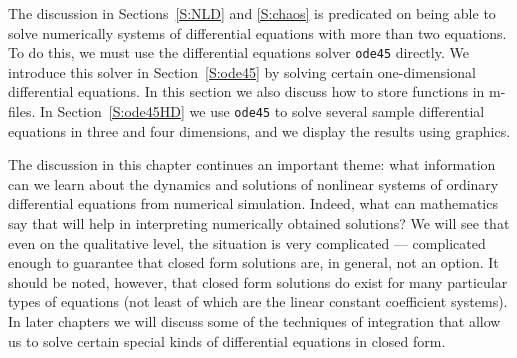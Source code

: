 \documentclass{ximera}
\begin{document}
The discussion in Sections~\ref{S:NLD} and \ref{S:chaos} is predicated on 
being able to solve numerically systems of differential equations with more 
than two equations.  To do this, we must use the \Matlab differential 
equations solver {\tt ode45} directly.  We introduce this solver in 
Section~\ref{S:ode45} by solving certain one-dimensional differential 
equations.  In this section we also discuss how to store functions in \Matlab 
m-files.  In Section~\ref{S:ode45HD} we use {\tt ode45} to solve several 
sample differential equations in three and four dimensions, and we display 
the results using \Matlab graphics. 

The discussion in this chapter continues an important theme: what 
information can we learn about the dynamics and solutions of nonlinear 
systems of ordinary differential equations from numerical simulation.  
Indeed, what can mathematics say that will help in interpreting numerically 
obtained solutions?  We will see that even on the qualitative level, the 
situation is very complicated --- complicated enough to guarantee that closed 
form solutions are, in general, not an option.  It should be noted, however,
that closed form solutions do exist for many particular types of equations 
(not least of which are the linear constant coefficient systems).  In later
chapters we will discuss some of the techniques of integration that allow us
to solve certain special kinds of differential equations in closed form.
\end{document}
